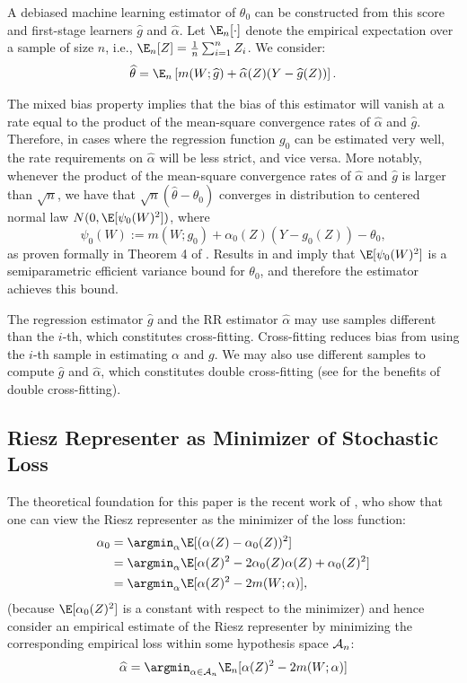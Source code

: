 \documentclass[nohyperref]{article}
\theoremstyle{plain}
\theoremstyle{definition}
\theoremstyle{remark}
\begin{document}
A debiased machine learning estimator of $\theta_0$ can be constructed from this score and first-stage learners $\widehat{g}$ and $\widehat\alpha$. Let $\E_n[\cdot]$ denote the empirical expectation over a sample of size $n$, i.e., $\E_n[Z]=\frac{1}{n}\sum_{i=1}^n Z_i$. We consider:
\begin{align}
    \widehat\theta = \E_n\left[m(W; \widehat{g}) + \widehat\alpha(Z)(Y-\widehat{g}(Z))\right].
\end{align}

The mixed bias property implies that the bias of this estimator will vanish at a rate equal to the product of the mean-square convergence rates of $\widehat\alpha$ and $\widehat{g}$. Therefore, in cases where the regression function $g_0$ can be estimated very well, the rate requirements on $\widehat{\alpha}$ will be less strict, and vice versa. More notably, whenever the product of the mean-square convergence rates of $\widehat\alpha$ and $\widehat{g}$ is larger than $\sqrt{n}$, we have that $\sqrt{n} (\widehat{\theta} - \theta_0)$ converges in distribution to centered normal law $N(0, \E[\psi_0(W)^2])$, where $$\psi_0(W) := m(W; g_0) + \alpha_0(Z)(Y-g_0(Z))-\theta_0,$$ as proven formally in Theorem 4 of \citet{chernozhukov2021automatic}.  Results in \citet{newey1994asymptotic} and \citet{chernozhukov2018global} imply that $\E[\psi_0(W)^2]$ is a semiparametric efficient variance bound for $\theta_0$, and therefore the  estimator achieves this bound.

The regression estimator $\widehat{g}$ and the RR estimator $\widehat{\alpha}$ may use samples different than the $i$-th, which constitutes cross-fitting. Cross-fitting reduces bias from using the $i$-th sample in estimating $\alpha$ and $g$. We may also use
different samples to compute $\widehat{g}$ and $\widehat{\alpha}$, which constitutes double cross-fitting (see \citealp{newey2018cross} for the benefits of double cross-fitting).

\subsection{Riesz Representer as Minimizer of Stochastic Loss}\label{sec:riesz}
The theoretical foundation for this paper is the recent work of \citet{chernozhukov2021automatic}, who show that one can view the Riesz representer as the minimizer of the loss function:
\begin{align*}
\alpha_0 & = \argmin_\alpha \E[(\alpha(Z) - \alpha_0(Z))^2]
\\ & = \argmin_\alpha \E[\alpha(Z)^2 - 2\alpha_0(Z)\alpha(Z) + \alpha_0(Z)^2]
\\ & = \argmin_\alpha \E[\alpha(Z)^2 - 2m(W; \alpha)],
\end{align*}
(because $\E[\alpha_0(Z)^2]$ is a constant with respect to the minimizer) and hence consider an empirical estimate of the Riesz representer by minimizing the corresponding empirical loss within some hypothesis space ${\cal A}_n$:
\begin{equation}\label{eq:rieszloss}
    {\widehat{\alpha} = \argmin_{\alpha\in {\cal A}_n} \E_n[\alpha(Z)^2 - 2m(W; \alpha)]}
\end{equation}
\end{document}
